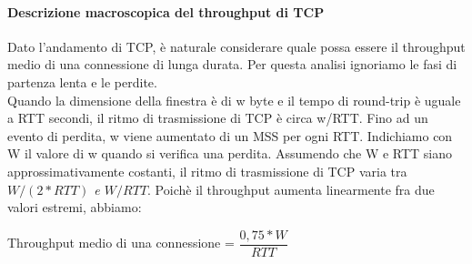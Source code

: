 \documentclass[11pt,a4paper]{book}
\begin{document}
\paragraph{Descrizione macroscopica del throughput di TCP}
Dato l'andamento di TCP, è naturale considerare quale possa essere il throughput medio di una connessione di lunga durata. Per questa analisi ignoriamo le fasi di partenza lenta e le perdite.\\
Quando la dimensione della finestra è di w byte e il tempo di round-trip è uguale a RTT secondi, il ritmo di trasmissione di TCP è circa w/RTT. Fino ad un evento di perdita, w viene aumentato di un MSS per ogni RTT. Indichiamo con W il valore di w quando si verifica una perdita. Assumendo che W e RTT siano approssimativamente costanti, il ritmo di trasmissione di TCP varia tra \emph{$W/(2 * RTT)$ e $W/RTT$}. Poichè il throughput aumenta linearmente fra due valori estremi, abbiamo:
\begin{center}
	Throughput medio di una connessione = $\dfrac{0,75 * W}{RTT}$
\end{center}
\end{document}
